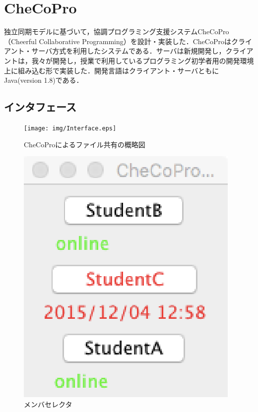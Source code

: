 \chapter{CheCoPro}\label{CH}

独立同期モデルに基づいて，協調プログラミング支援システムCheCoPro（Cheerful Collaborative Programming）を設計・実装した．CheCoProはクライアント・サーバ方式を利用したシステムである．サーバは新規開発し，クライアントは，我々が開発し，授業で利用しているプログラミング初学者用の開発環境上に組み込む形で実装した．開発言語はクライアント・サーバともにJava(version 1.8)である．

\section{インタフェース}

\begin{figure}[tb]
	\begin{center}
		\texttt{[image: img/Interface.eps]}
		\caption{CheCoProによるファイル共有の概略図}
		\label{fig:ev}
	\end{center}
\end{figure}


\begin{figure}[tb]
	\begin{center}
		\includegraphics[scale = 0.5]{img/member.eps}
		\caption{メンバセレクタ}
		\label{fig:ms}
	\end{center}
\end{figure}

